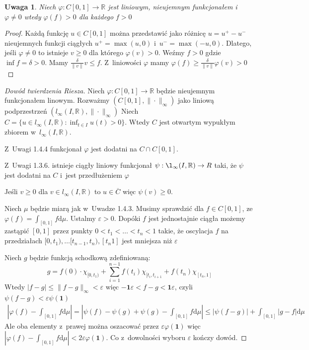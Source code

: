 \documentclass[11pt]{mwrep}
\renewcommand{\[}{\begin{equation}}
\renewcommand{\]}{\end{equation}}
\newcommand{\R}{{\ensuremath{\mathbb R}}}
\newcommand{\dd}{\mathrm{d}}
\newcommand{\norm}{\|\cdot\|}
\newtheorem{uw}[subsection]{Uwaga}
\begin{document}
\begin{uw}
	Niech $\varphi:C[0,1] \to \R$ jest liniowym, nieujemnym funkcjonałem i~$\varphi \not = 0$ wtedy  $\varphi(f) >0 $ dla każdego $f>0$ 
\end{uw}
\begin{proof}
	Każdą funkcję $u \in C[0,1]$ można przedstawić jako różnicę $u=u^+-u^-$ nieujemnych funkcji ciągłych $u^+ = \max(u,0)$ i~$u^- = \max(-u,0)$.
	Dlatego, jeśli $\varphi\not = 0$ to istnieje $v\ge 0$ dla którego $\varphi(v)>0$.
	Weźmy $f>0$ gdzie $\inf f = \delta >0$. Mamy $\frac{\delta}{\|v\|}v\le f$. Z~liniowości $\varphi$ mamy $\varphi(f)\ge \frac{\delta}{\|v\|}\varphi(v)>0$
\end{proof}
\begin{proof}[Dowód twierdzenia Riesza]
	Niech $\varphi: C[0,1] \to \R$ będzie  nieujemnym funkcjonałem linowym.
	Rozważmy $\left( C[0,1],\norm_\infty \right)$ jako liniową podprzestrzeń $\left( l_\infty (I,\R),\norm_\infty \right)$
	Niech $C=\{ u\in l_\infty (I,\R): \inf_{t \in I} u(t) >0\}$. Wtedy $C$ jest otwartym wypukłym zbiorem w~$l_\infty(I,\R)$. \par
	Z~Uwagi 1.4.4 funkcjonał $\varphi$ jest dodatni na $C \cap C[0,1]$.\par
	Z~Uwagi 1.3.6.	istnieje ciągły liniowy funkcjonał $\psi:\l_\infty(I,\R) \to R$ taki, że $\psi$ jest dodatni na $C$ i~jest przedłużeniem $\varphi$\par
	Jeśli $v\ge 0$ dla $v \in l_\infty (I,\R)$ to $u\in \overline{C}$ więc $\psi(v)\ge0$.\par
	Niech $\mu$ będzie miarą jak w~Uwadze 1.4.3.
	Musimy sprawdzić dla $f\in C[0,1]$, ze $\varphi(f) = \int_{[0,1]}f \dd \mu$.
	Ustalmy $\varepsilon>0$. Dopóki $f$ jest jednostajnie ciągła możemy zastąpić $[0,1]$ przez punkty $0<t_1<\ldots<t_n<1$
	takie, że oscylacja $f$ na przedziałach $[0,t_1),\ldots [t_{n-1},t_{n}), [t_n 1]$ jest mniejsza niż $\varepsilon$\par
	Niech $g$  będzie funkcją schodkową zdefiniowaną: 
	$$g= f(0)\cdot \chi_{[0,t_1)} + \sum_{i=1}^{n-1}f(t_i) \chi_{[t_i,t_{i+1}} + f(t_n) \chi_{[t_n,1]}$$
	Wtedy $|f-g| \le \|f-g\|_\infty<\varepsilon$ więc $-\mathbf{1} \varepsilon < f-g < \mathbf{1} \varepsilon$, 
	czyli $\psi(f-g) <\varepsilon \psi(\mathbf{1})$
 	\begin{multline}
	\left|\varphi(f) - \int_{[0,1]} f \dd \mu\right| = \left| \psi(f) - \psi(g) +\psi(g) - \int_{[0,1]} f \dd \mu \right|
	\le \left| \psi(f-g)\right| + \int_{[0,1]} \left| g - f \right| \dd\mu
	\nonumber
  \end{multline}
  Ale oba elementy z~prawej można oszacować przez $\varepsilon\varphi(\mathbf{1})$ więc $\left|\varphi(f) - \int_{[0,1]} f \dd \mu\right|<2\varepsilon\varphi(\mathbf{1})$.
  Co z~dowolności wyboru $\varepsilon$ kończy dowód.
\end{proof}
\end{document}
